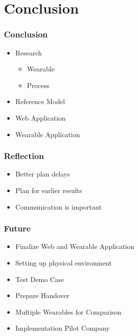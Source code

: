 \section{Conclusion}
\begin{frame}\frametitle{Conclusion}
	\begin{itemize}
		\item Research
		\begin{itemize}
			\item Wearable
			\item Process
		\end{itemize}
		\item Reference Model
		\item Web Application
		\item Wearable Application
	\end{itemize}
\end{frame}
\begin{frame}\frametitle{Reflection}
	\begin{itemize}
		\item Better plan delays
		\item Plan for earlier results
		\item Communication is important
	\end{itemize}
\end{frame}
\begin{frame}\frametitle{Future}
	\begin{itemize}
		\item Finalize Web and Wearable Application
		\item Setting up physical environment
		\item Test Demo Case
		\item Prepare Handover
	\end{itemize}
	\begin{itemize}
		\item Multiple Wearables for Comparison
		\item Implementation Pilot Company
	\end{itemize}
\end{frame}